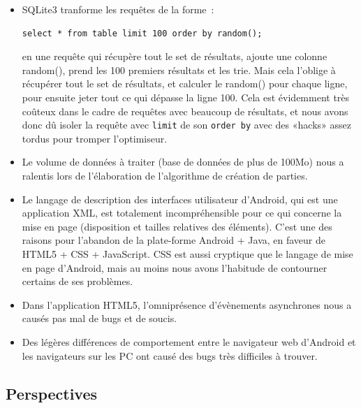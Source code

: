 \documentclass[a4paper,11pt,french]{article}
\def\android{Android\texttrademark{}}
\begin{document}
{\begin{itemize}
\begin{verbatim}
select * from (select * from table where condition) where condition
\end{verbatim}

Donc nécessité de ré-écrire certaines requêtes avec des jointures à priori beaucoup moins efficaces, mais qui le sont plus grâce aux index.
\item SQLite3 tranforme les requêtes de la forme~:

\begin{verbatim}
select * from table limit 100 order by random();
\end{verbatim}

  en une requête qui récupère tout le set de résultats, ajoute une colonne random(), prend les 100 premiers résultats et les trie. Mais cela
  l'oblige à récupérer tout le set de résultats, et calculer le random() pour chaque ligne, pour ensuite jeter tout ce qui dépasse la ligne
  100. Cela est évidemment très coûteux dans le cadre de requêtes avec beaucoup de résultats, et nous avons donc dû isoler la requête avec
  \verb!limit! de son \verb!order by! avec des «hacks» assez tordus pour tromper l'optimiseur.
\item Le volume de données à traiter (base de données de plus de 100Mo) nous a ralentis lors de l'élaboration de l'algorithme de création de
  parties.
\item Le langage de description des interfaces utilisateur d'\android{}, qui est une application XML, est totalement incompréhensible pour
  ce qui concerne la mise en page (disposition et tailles relatives des éléments). C'est une des raisons pour l'abandon de la plate-forme
  \android{} + Java, en faveur de HTML5 + CSS + JavaScript. CSS est aussi cryptique que le langage de mise en page d'\android{}, mais au
  moins nous avons l'habitude de contourner certains de ses problèmes.
\item Dans l'application HTML5, l'omniprésence d'évènements asynchrones nous a causés pas mal de bugs et de soucis.
\item Des légères différences de comportement entre le navigateur web d'\android{} et les navigateurs sur les PC ont causé des bugs très
  difficiles à trouver.
\end{itemize}

\subsection{Perspectives}

}
\end{document}
